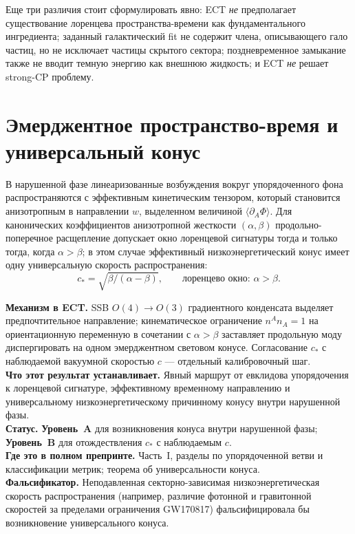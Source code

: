 \documentclass[11pt,a4paper]{article}
\newcommand{\statA}{\textbf{Уровень~A}}
\newcommand{\statB}{\textbf{Уровень~B}}
\begin{document}
Еще три различия стоит сформулировать явно:
ECT \emph{не} предполагает существование лоренцева
пространства-времени как фундаментального ингредиента;
заданный галактический fit не содержит члена, описывающего гало частиц, но
не исключает частицы скрытого сектора; поздневременное замыкание также не
вводит темную энергию как внешнюю жидкость;
и ECT \emph{не} решает strong-CP проблему.

\section{Эмерджентное пространство-время и универсальный конус}
\label{sec:cone}

В нарушенной фазе линеаризованные возбуждения вокруг
упорядоченного фона распространяются с эффективным кинетическим
тензором, который становится анизотропным в направлении $w$,
выделенном величиной $\langle\partial_A\Phi\rangle$.
Для канонических коэффициентов анизотропной жесткости
$(\alpha,\beta)$ продольно-поперечное расщепление допускает окно
лоренцевой сигнатуры тогда и только тогда, когда $\alpha>\beta$;
в этом случае эффективный низкоэнергетический конус имеет одну
универсальную скорость распространения:
\begin{equation}
  \label{eq:cstar}
  c_* = \sqrt{\beta/(\alpha-\beta)},
  \qquad
  \text{лоренцево окно: } \alpha>\beta.
\end{equation}

\begin{mechbox}
\textbf{Механизм в ECT.}
SSB $O(4)\!\to\!O(3)$ градиентного конденсата выделяет
предпочтительное направление; кинематическое ограничение
$n^An_A=1$ на ориентационную переменную в сочетании с
$\alpha>\beta$ заставляет продольную моду диспергировать на одном
эмерджентном световом конусе. Согласование $c_*$ с наблюдаемой
вакуумной скоростью $c$ — отдельный калибровочный шаг.\\
\textbf{Что этот результат устанавливает.} Явный маршрут от
евклидова упорядочения к лоренцевой сигнатуре, эффективному
временному направлению и универсальному низкоэнергетическому
причинному конусу внутри нарушенной фазы.\\
\textbf{Статус.} \statA{} для возникновения конуса внутри
нарушенной фазы; \statB{} для отождествления $c_*$ с наблюдаемым
$c$.\\
\textbf{Где это в полном препринте.} Часть~I, разделы по
упорядоченной ветви и классификации метрик; теорема об
универсальности конуса.\\
\textbf{Фальсификатор.} Неподавленная секторно-зависимая
низкоэнергетическая скорость распространения
(например, различие фотонной и гравитонной скоростей за пределами
ограничения GW170817) фальсифицировала бы возникновение
универсального конуса.
\end{mechbox}
\end{document}
